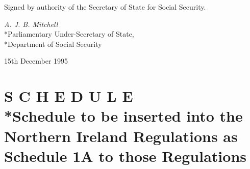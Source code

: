 \documentclass[12pt,a4paper]{article}
\begin{document}


\bigskip

Signed by authority of the Secretary of State for Social Security.

{\raggedleft
\emph{A. J. B. Mitchell}\\*Parliamentary Under-Secretary of State,\\*Department of Social Security

}

15th December 1995

\clearpage

\part[Schedule --- Schedule to be inserted into the Northern Ireland Regulations as Schedule 1A to those Regulations]{S C H E D U L E\\*Schedule to be inserted into the Northern Ireland Regulations as Schedule 1A to those Regulations}

\renewcommand\parthead{--- Schedule}
\end{document}
